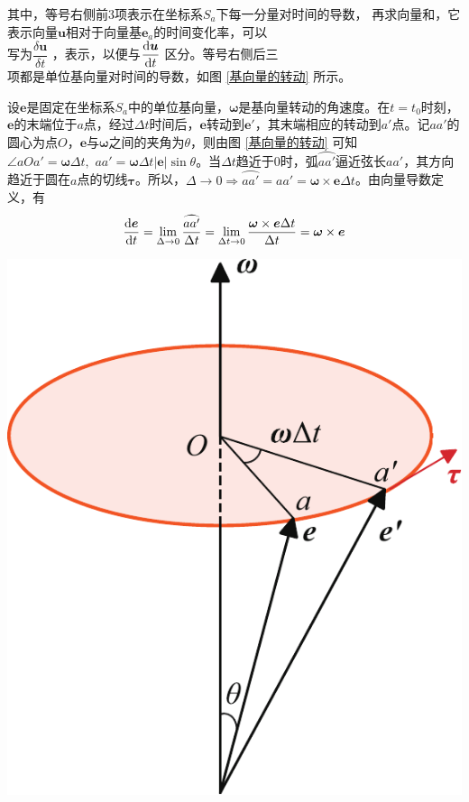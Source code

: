 \noindent
\begin{minipage}{0.6\linewidth}
	其中，等号右侧前3项表示在坐标系$S_a$下每一分量对时间的导数， 再求向量和，它表示向量$\bm{u}$相对于向量基$\bm{e}_a$的时间变化率，可以\\[0.2em]
	写为$\dfrac{\delta \bm{u}}{\delta t}$ ，表示，以便与$\dfrac{{\rm{d}} \bm{u}}{{\rm{d}} t}$ 区分。等号右侧后三\\[0.2em]
	项都是单位基向量对时间的导数，如图 \ref{基向量的转动} 所示。
	
	\qquad 设$\bm{e}$是固定在坐标系$S_a$中的单位基向量，$\bm{\omega}$是基向量转动的角速度。在$t = t_0$时刻，$\bm{e}$的末端位于$a$点，经过$\Delta t$时间后，$\bm{e}$转动到$\bm{e}'$，其末端相应的转动到$a'$点。记$aa'$的圆心为点$O$，$\bm{e}$与$\bm{\omega}$之间的夹角为$\theta$，则由图 \ref{基向量的转动} 可知$\angle aOa' = \bm{\omega} \Delta t,\, \, aa' = \bm{\omega}\Delta t |\bm{e}| \sin \theta$。当$\Delta t$趋近于0时，弧$\wideparen{aa'}$逼近弦长$aa'$，其方向趋近于圆在$a$点的切线$\bm{\tau}$。所以，$\Delta \to 0 \Rightarrow \wideparen{aa'} = aa' = \bm{\omega} \times \bm{e}\Delta t$。由向量导数定义，有
	\begin{equation}
		\dfrac{\d \bm{e}}{\d t} = \lim\limits_{\Delta \to 0}\dfrac{\wideparen{aa'}}{\Delta t} = \lim\limits_{\Delta t \to 0} \dfrac{\bm{\omega} \times \bm{e} \Delta t}{\Delta t} = \bm{\omega} \times \bm{e}
	\end{equation}
\end{minipage}
\begin{minipage}{0.4\linewidth}
	\centering
	\includegraphics[width=0.8\linewidth]{pic/向量转动}
	\label{基向量的转动}
\end{minipage}
\vspace*{0.5em}

